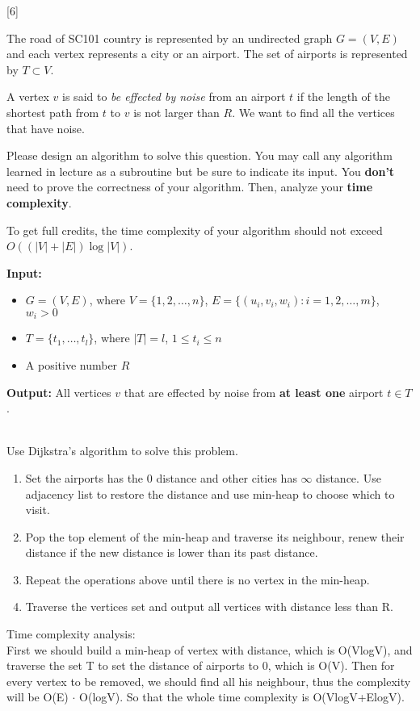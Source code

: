 [6]

The road of SC101 country is represented by an undirected graph $G = (V, E)$ and each vertex represents a city or an airport. The set of airports is represented by $T \subset V$.

A vertex $v$ is said to \textit{be effected by noise} from an airport $t$ if the length of the shortest path from $t$ to $v$ is not larger than $R$. We want to find all the vertices that have noise.

Please design an algorithm to solve this question. You may call any algorithm learned in lecture as a subroutine but be sure to indicate its input. You \textbf{don't} need to prove the correctness of your algorithm. Then, analyze your \textbf{time complexity}.

To get full credits, the time complexity of your algorithm should not exceed $O\left(\left(|V| + |E|\right) \log |V|\right)$.

\textbf{Input:}
\begin{itemize}
    \item $G = (V, E)$, where $V=\{1,2,\ldots, n\}$, $E=\{(u_i,v_i,w_i):i=1,2,\ldots, m\}$, $w_i > 0$
    \item $T = \{t_1, \ldots, t_{l}\}$, where $|T| = l$, $1 \le t_i \le n$
    \item A positive number $R$
\end{itemize}

\textbf{Output:} All vertices $v$ that are effected by noise from \textbf{at least one} airport $t \in T$.


\begin{solution} \\
    Use Dijkstra's algorithm to solve this problem.
    \begin{enumerate}
        \item Set the airports has the 0 distance and other cities has $\infty$ distance. Use adjacency list to restore the distance and use min-heap to choose which to visit.
        \item Pop the top element of the min-heap and traverse its neighbour, renew their distance if the new distance is lower than its past distance.
        \item Repeat the operations above until there is no vertex in the min-heap.
        \item Traverse the vertices set and output all vertices with distance less than R.
    \end{enumerate}
    Time complexity analysis: \\
    First we should build a min-heap of vertex with distance, which is O(VlogV), and traverse the set T to set the distance of airports to 0, which is O(V).
    Then for every vertex to be removed, we should find all his neighbour, thus the complexity will be O(E) $\cdot$ O(logV).
    So that the whole time complexity is O(VlogV+ElogV).
\end{solution}




